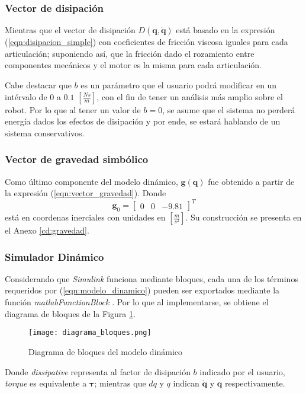     \subsubsection{Vector de disipación}
    Mientras que el vector de disipación $D(\boldsymbol{q}, \boldsymbol{\dot{q}})$ está basado en la expresión (\ref{eqn:disipacion_simple}) con coeficientes de fricción
    viscosa iguales para cada articulación; suponiendo así, que la fricción dado el rozamiento entre componentes mecánicos y el motor es la misma para cada articulación. 

    Cabe destacar que $b$ es un parámetro que el usuario podrá modificar en un intérvalo de $0$ a $0.1$ $[\frac{Ns}{m}]$, con el fin de tener un análisis más amplio sobre
    el robot. Por lo que al tener un valor de $b=0$, se asume que el sistema no perderá energía dados los efectos de disipación y por ende, se estará hablando de un sistema
    conservativos. 

    \subsubsection{Vector de gravedad simbólico}
    Como último componente del modelo dinámico, $\boldsymbol{g}(\boldsymbol{q})$ fue obtenido a partir de la expresión (\ref{eqn:vector_gravedad}). Donde
    \begin{equation}
        \label{eqn:g_0}
         \boldsymbol{g}_0 = \begin{bmatrix} 0 & 0 & -9.81 \end{bmatrix}^T
    \end{equation}
    está en coordenas inerciales con unidades en $[\frac{m}{s^2}]$. Su construcción se presenta en el Anexo \ref{cd:gravedad}.

    \subsubsection{Simulador Dinámico}
    Considerando que \emph{Simulink} funciona mediante bloques, cada una de los términos requeridos por (\ref{eqn:modelo_dinamico}) pueden ser exportados mediante la
    función \emph{matlabFunctionBlock} \cite{matlabFunctionBlock}. Por lo que al implementarse, se obtiene el diagrama de bloques de la Figura \ref{fig:diagrama_bloques}.
    \begin{figure}[H]
        \texttt{[image: diagrama\_bloques.png]}
        \centering
        \caption{Diagrama de bloques del modelo dinámico}
        \label{fig:diagrama_bloques}
    \end{figure}
    Donde \emph{dissipative} representa al factor de disipación $b$ indicado por el usuario, \emph{torque} es equivalente a $\boldsymbol{\tau}$; mientras que 
    $dq$ y $q$ indican $\boldsymbol{\dot{q}}$ y $\boldsymbol{q}$ respectivamente. 
    
